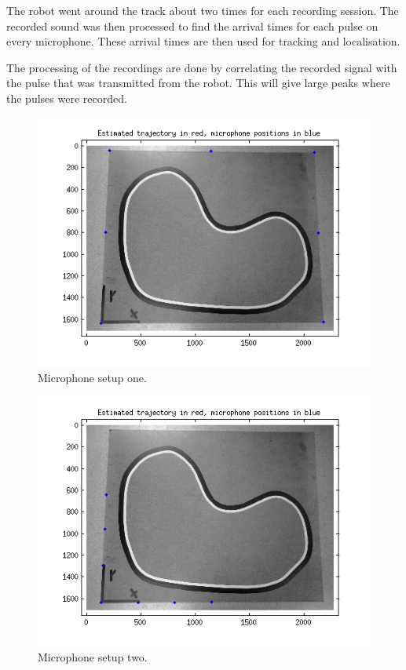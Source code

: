\documentclass[10pt,a4paper]{report}
\begin{document}
The robot went around the track about two times for each recording session.
The recorded sound was then processed to find the arrival times for each pulse on every microphone.
These arrival times are then used for tracking and localisation.

The processing of the recordings are done by correlating the recorded signal with the pulse that was transmitted from the robot.
This will give large peaks where the pulses were recorded.

\begin{figure}[!h]
  \label{good_setup}
  \includegraphics[scale=0.9]{microphone_pos_good.png}
  \caption{Microphone setup one.}
\end{figure}

\begin{figure}[!h]
  \label{bad_setup}
  \includegraphics[scale=0.9]{microphone_pos_bad.png}
  \caption{Microphone setup two.}
\end{figure}
\end{document}
